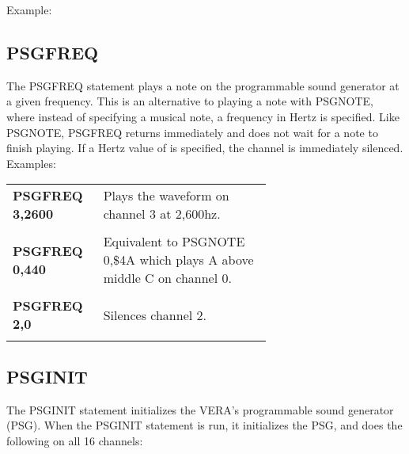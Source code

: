 Example:\\


\subsection{PSGFREQ}

The {\ttfamily PSGFREQ} statement plays a note on the programmable sound
generator at a given frequency.  This is an alternative to playing a note with
{\ttfamily PSGNOTE}, where instead of specifying a musical note, a frequency in
Hertz is specified.  Like {\ttfamily PSGNOTE}, {\ttfamily PSGFREQ} returns
immediately and does not wait for a note to finish playing.  If a Hertz value
of {} is specified, the channel is immediately silenced.\\

Examples:\\

\begin{tabular}{l p{0.65\linewidth}}

	{\ttfamily\bfseries PSGFREQ 3,2600}&Plays the waveform on channel 3 at 2,600hz.\\\\

	{\ttfamily\bfseries PSGFREQ 0,440}&Equivalent to {\ttfamily PSGNOTE 0,\$4A}
	which plays A above middle C on channel 0.\\\\

	{\ttfamily\bfseries PSGFREQ 2,0}&Silences channel 2.\\\\

\end{tabular}

\subsection{PSGINIT}

The {\ttfamily PSGINIT} statement initializes the VERA's programmable sound
generator (PSG).  When the {\ttfamily PSGINIT} statement is run, it initializes
the PSG, and does the following on all 16 channels:\\


